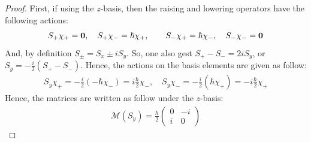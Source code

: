 \documentclass{article}
\begin{document}
\begin{proof}
    First, if using the $z$-basis, then the raising and lowering operators have the following actions:
    \begin{align}
        S_+ \chi_+ = \mathbf{0},\quad S_+ \chi_- = \hbar\chi_+,\quad\quad S_-\chi_+ = \hbar\chi_-,\quad S_-\chi_- = \mathbf{0}
    \end{align}
    And, by definition $S_\pm = S_x \pm i S_y$. So, one also gest $S_+ - S_- = 2i S_y$, or $S_y = -\frac{i}{2}(S_+-S_-)$. 
    Hence, the actions on the basis elements are given as follow:
    \begin{align}
        S_y \chi_+ = -\frac{i}{2}(-\hbar \chi_-) = i\frac{\hbar}{2}\chi_-,\quad S_y \chi_- = -\frac{i}{2}(\hbar \chi_+) = -i\frac{\hbar}{2}\chi_+
    \end{align}
    Hence, the matrices are written as follow under the $z$-basis:
    \begin{align}
        \mathcal{M}(S_y) = \frac{\hbar}{2}\begin{pmatrix}
            0&-i\\i&0
        \end{pmatrix}
    \end{align}


\end{proof}
\end{document}
